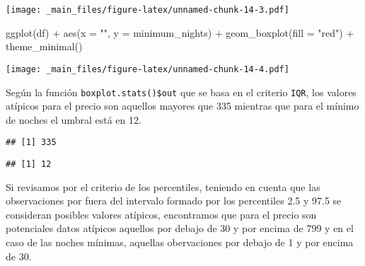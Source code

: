 \documentclass[
]{book}
\newenvironment{Shaded}{\begin{snugshade}}{\end{snugshade}}
\newcommand{\AttributeTok}[1]{\textcolor[rgb]{0.77,0.63,0.00}{#1}}
\newcommand{\FunctionTok}[1]{\textcolor[rgb]{0.00,0.00,0.00}{#1}}
\newcommand{\NormalTok}[1]{#1}
\newcommand{\SpecialCharTok}[1]{\textcolor[rgb]{0.00,0.00,0.00}{#1}}
\newcommand{\StringTok}[1]{\textcolor[rgb]{0.31,0.60,0.02}{#1}}
\begin{document}
\texttt{[image: \_main\_files/figure-latex/unnamed-chunk-14-3.pdf]}

\begin{Shaded}
\begin{Highlighting}[]
\FunctionTok{ggplot}\NormalTok{(df) }\SpecialCharTok{+}
  \FunctionTok{aes}\NormalTok{(}\AttributeTok{x =} \StringTok{""}\NormalTok{, }\AttributeTok{y =}\NormalTok{ minimum\_nights) }\SpecialCharTok{+}
  \FunctionTok{geom\_boxplot}\NormalTok{(}\AttributeTok{fill =} \StringTok{"red"}\NormalTok{) }\SpecialCharTok{+}
  \FunctionTok{theme\_minimal}\NormalTok{()}
\end{Highlighting}
\end{Shaded}

\texttt{[image: \_main\_files/figure-latex/unnamed-chunk-14-4.pdf]}

Según la función \texttt{boxplot.stats()\$out} que se basa en el criterio \texttt{IQR}, los valores atípicos para el precio son aquellos mayores que 335 mientras que para el mínimo de noches el umbral está en 12.

\begin{Shaded}
\end{Shaded}

\begin{verbatim}
## [1] 335
\end{verbatim}

\begin{Shaded}
\end{Shaded}

\begin{verbatim}
## [1] 12
\end{verbatim}

Si revisamos por el criterio de los percentiles, teniendo en cuenta que las observaciones por fuera del intervalo formado por los percentiles 2.5 y 97.5 se consideran posibles valores atípicos, encontramos que para el precio son potenciales datos atípicos aquellos por debajo de 30 y por encima de 799 y en el caso de las noches mínimas, aquellas obervaciones por debajo de 1 y por encima de 30.
\end{document}
